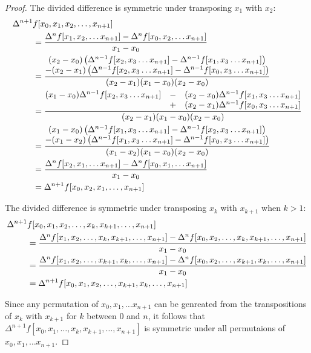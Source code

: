 \documentclass[12pt]{article}
\begin{document}
\begin{proof}
The divided difference is symmetric under transposing $x_1$ with
$x_2$:
\begin{align*}
\Delta^{n+1} &f [x_0, x_1, x_2, \ldots, x_{n+1}] \\
&=
{\Delta^n f [x_1, x_2, \ldots x_{n+1}] -
 \Delta^n f [x_0, x_2, \ldots x_{n+1}]
 \over x_1 - x_0} \\ &=
 {\begin{matrix}
   (x_2 - x_0) \left( \Delta^{n-1} f [x_2, x_3 \ldots x_{n+1}] -
     \Delta^{n-1} f [x_1, x_3 \ldots x_{n+1}] \right) \\ -
   (x_2 - x_1) \left( \Delta^{n-1} f [x_2, x_3 \ldots x_{n+1}] -
    \Delta^{n-1} f [x_0, x_3 \ldots x_{n+1}] \right)
  \end{matrix}
 \over (x_2 - x_1) (x_1 - x_0) (x_2 - x_0)} \\ &=
 {\begin{matrix}
   (x_1 - x_0) \Delta^{n-1} f [x_2, x_3 \ldots x_{n+1}] &-&
   (x_2 - x_0) \Delta^{n-1} f [x_1, x_3 \ldots x_{n+1}] \\ &+&
   (x_2 - x_1) \Delta^{n-1} f [x_0, x_3 \ldots x_{n+1}]
  \end{matrix}
 \over (x_2 - x_1) (x_1 - x_0) (x_2 - x_0)} \\ &= 
 {\begin{matrix}
   (x_1 - x_0) \left( \Delta^{n-1} f [x_1, x_3 \ldots x_{n+1}] -
     \Delta^{n-1} f [x_2, x_3 \ldots x_{n+1}] \right) \\ -
   (x_1 - x_2) \left( \Delta^{n-1} f [x_1, x_3 \ldots x_{n+1}] -
    \Delta^{n-1} f [x_0, x_3 \ldots x_{n+1}] \right)
  \end{matrix}
 \over (x_1 - x_2) (x_1 - x_0) (x_2 - x_0)} \\ &=
{\Delta^n f [x_2, x_1, \ldots x_{n+1}] -
 \Delta^n f [x_0, x_1, \ldots x_{n+1}]
 \over x_1 - x_0} \\ &=
\Delta^{n+1} f [x_0, x_2, x_1, \ldots, x_{n+1}]
\end{align*}

The divided difference is symmetric under transposing
$x_k$ with $x_{k+1}$ when $k > 1$:
\begin{align*} 
\Delta^{n+1} &f [x_0, x_1, x_2, \ldots, x_k, x_{k+1}, \ldots, x_{n+1}] \\ &=
{\Delta^n f [x_1, x_2, \ldots, x_k, x_{k+1}, \ldots, x_{n+1}] -
 \Delta^n f [x_0, x_2, \ldots, x_k, x_{k+1}, \ldots, x_{n+1}] 
 \over x_1 - x_0} \\ &=
{\Delta^n f [x_1, x_2, \ldots, x_{k+1}, x_k, \ldots, x_{n+1}] -
 \Delta^n f [x_0, x_2, \ldots, x_{k+1}, x_k, \ldots, x_{n+1}] 
 \over x_1 - x_0} \\ &=
\Delta^{n+1} f [x_0, x_1, x_2, \ldots, x_{k+1}, x_k, \ldots, x_{n+1}]
\end{align*}

Since any permutation of $x_0, x_1, \ldots x_{n+1}$ can be 
genreated from the transpositions of $x_k$ with $x_{k+1}$ 
for $k$ between $0$ and $n$, it follows that
$\Delta^{n+1} f [x_0, x_1, \ldots, x_k, x_{k+1}, \ldots, x_{n+1}]$
is symmetric under all permutaions of $x_0, x_1, \ldots x_{n+1}$.
\end{proof}
\end{document}

